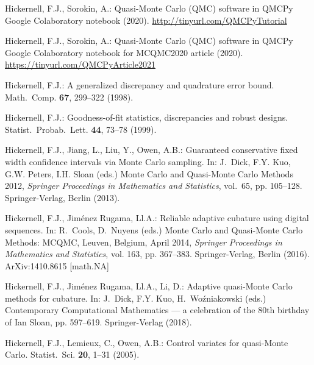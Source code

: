 \documentclass[graybox]{svmult}
\begin{document}
\begin{thebibliography}{10}
Hickernell, F.J., Sorokin, A.: {Q}uasi-{M}onte {C}arlo {(QMC)} software in
  {QMCPy} {G}oogle {C}olaboratory notebook (2020).
\newblock \urlprefix\url{http://tinyurl.com/QMCPyTutorial}

Hickernell, F.J., Sorokin, A.: {Q}uasi-{M}onte {C}arlo {(QMC)} software in
  {QMCPy} {G}oogle {C}olaboratory notebook for {MCQMC2020} article (2020).
\newblock \urlprefix\url{https://tinyurl.com/QMCPyArticle2021}

Hickernell, F.J.: A generalized discrepancy and quadrature error bound.
\newblock Math.\ Comp. \textbf{67}, 299--322 (1998).
\newblock {}

Hickernell, F.J.: Goodness-of-fit statistics, discrepancies and robust
  designs.
\newblock Statist.\ Probab.\ Lett. \textbf{44}, 73--78 (1999).
\newblock {}

Hickernell, F.J., Jiang, L., Liu, Y., Owen, A.B.: Guaranteed conservative
  fixed width confidence intervals via {M}onte {C}arlo sampling.
\newblock In: J.~Dick, F.Y. Kuo, G.W. Peters, I.H. Sloan (eds.) {M}onte {C}arlo
  and Quasi-{M}onte {C}arlo Methods 2012, \emph{Springer Proceedings in
  Mathematics and Statistics}, vol.~65, pp. 105--128. Springer-Verlag, Berlin
  (2013).
\newblock {}

Hickernell, F.J., {Jim\'enez Rugama}, {\relax Ll}.A.: Reliable adaptive
  cubature using digital sequences.
\newblock In: R.~Cools, D.~Nuyens (eds.) {M}onte {C}arlo and Quasi-{M}onte
  {C}arlo Methods: {MCQMC}, {L}euven, {B}elgium, {A}pril 2014, \emph{Springer
  Proceedings in Mathematics and Statistics}, vol. 163, pp. 367--383.
  Springer-Verlag, Berlin (2016).
\newblock ArXiv:1410.8615 [math.NA]

Hickernell, F.J., {Jim\'enez Rugama}, {\relax Ll}.A., Li, D.: Adaptive
  quasi-{M}onte {C}arlo methods for cubature.
\newblock In: J.~Dick, F.Y. Kuo, H.~Wo\'zniakowski (eds.) Contemporary
  Computational Mathematics --- a celebration of the 80th birthday of {I}an
  {S}loan, pp. 597--619. Springer-Verlag (2018).
\newblock {}

Hickernell, F.J., Lemieux, C., Owen, A.B.: Control variates for
  quasi-{M}onte {C}arlo.
\newblock Statist.\ Sci. \textbf{20}, 1--31 (2005).
\newblock {}


\end{thebibliography}
\end{document}
